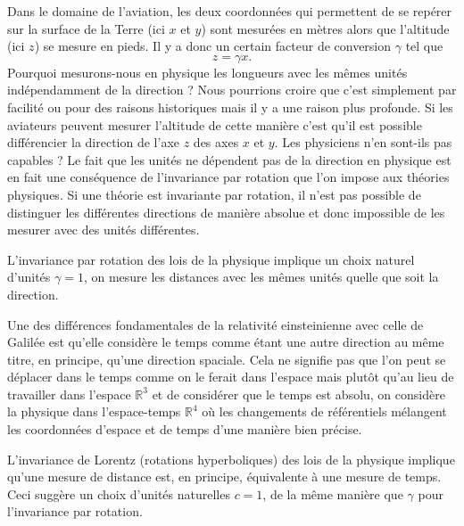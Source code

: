 \documentclass[a4paper,11pt]{report}
\theoremstyle{definition}
\theoremstyle{plain}
\theoremstyle{definition}
\theoremstyle{remark}
\begin{document}
        Dans le domaine de l'aviation, les deux coordonnées qui permettent de se repérer sur la surface de la Terre (ici $x$ et $y$) sont mesurées en mètres alors que l'altitude (ici $z$) se mesure en pieds. Il y a donc un certain facteur de conversion $\gamma$ tel que 
        \begin{equation}
            z = \gamma x.
        \end{equation}
        Pourquoi mesurons-nous en physique les longueurs avec les mêmes unités indépendamment de la direction ? Nous pourrions croire que c'est simplement par facilité ou pour des raisons historiques mais il y a une raison plus profonde. Si les aviateurs peuvent mesurer l'altitude de cette manière c'est qu'il est possible différencier la direction de l'axe $z$ des axes $x$ et $y$. Les physiciens n'en sont-ils pas capables ? Le fait que les unités ne dépendent pas de la direction en physique est en fait une conséquence de l'invariance par rotation que l'on impose aux théories physiques. Si une théorie est invariante par rotation, il n'est pas possible de distinguer les différentes directions de manière absolue et donc impossible de les mesurer avec des unités différentes.
        
        \begin{leftbar}
            L'invariance par rotation des lois de la physique implique un choix naturel d'unités $\gamma = 1$, on mesure les distances avec les mêmes unités quelle que soit la direction.
        \end{leftbar}
        
        Une des différences fondamentales de la relativité einsteinienne avec celle de Galilée est qu'elle considère le temps comme étant une autre direction au même titre, en principe, qu'une direction spaciale. Cela ne signifie pas que l'on peut se déplacer dans le temps comme on le ferait dans l'espace mais plutôt qu'au lieu de travailler dans l'espace $\mathbb{R}^3$ et de considérer que le temps est absolu, on considère la physique dans l'espace-temps $\mathbb{R}^4$ où les changements de référentiels mélangent les coordonnées d'espace et de temps d'une manière bien précise.
        
        \begin{leftbar}
            L'invariance de Lorentz (rotations hyperboliques) des lois de la physique implique qu'une mesure de distance est, en principe, équivalente à une mesure de temps. Ceci suggère un choix d'unités naturelles $c=1$, de la même manière que $\gamma$ pour l'invariance par rotation.
        \end{leftbar}
        
\end{document}
